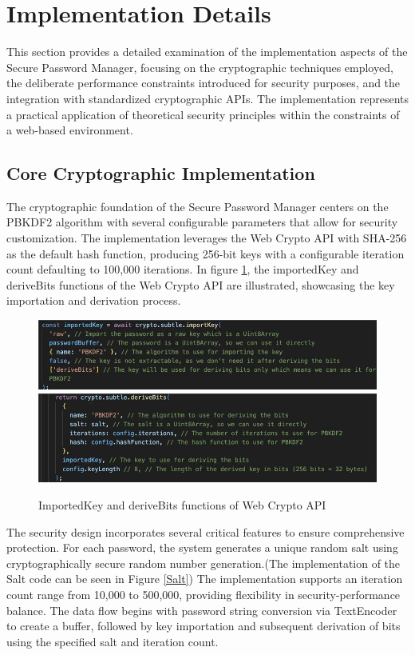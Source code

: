 \documentclass[11pt,a4paper]{article}
\begin{document}
\section{Implementation Details}
This section provides a detailed examination of the implementation aspects of the Secure Password Manager, focusing on the cryptographic techniques employed, the deliberate performance constraints introduced for security purposes, and the integration with standardized cryptographic APIs. The implementation represents a practical application of theoretical security principles within the constraints of a web-based environment.
\subsection{Core Cryptographic Implementation}
The cryptographic foundation of the Secure Password Manager centers on the PBKDF2 algorithm with several configurable parameters that allow for security customization. The implementation leverages the Web Crypto API with SHA-256 as the default hash function, producing 256-bit keys with a configurable iteration count defaulting to 100,000 iterations. In figure \ref{Algorithms}, the importedKey and deriveBits functions of the Web Crypto API are illustrated, showcasing the key importation and derivation process.
\begin{figure}[h!]
  \centering
  \includegraphics[width=1\linewidth]{images/Algo1.jpg}
  \includegraphics[width= 1\linewidth]{images/Algo2.jpg}
  \caption{ImportedKey and deriveBits functions of Web Crypto API}
  \label{Algorithms}
\end{figure}


The security design incorporates several critical features to ensure comprehensive protection. For each password, the system generates a unique random salt using cryptographically secure random number generation.(The implementation of the Salt code can be seen in Figure \ref{Salt}) The implementation supports an iteration count range from 10,000 to 500,000, providing flexibility in security-performance balance. The data flow begins with password string conversion via TextEncoder to create a buffer, followed by key importation and subsequent derivation of bits using the specified salt and iteration count.
\end{document}
